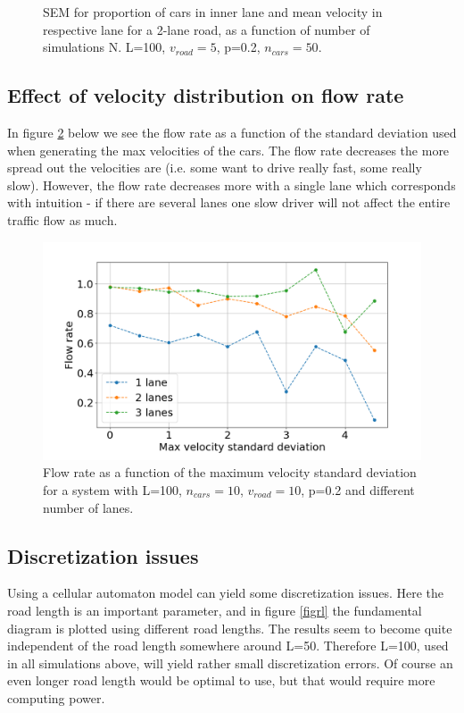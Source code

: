 \documentclass[a4paper,12pt]{article}
\begin{document}
\begin{figure}[H]
\begin{minipage}{.5\textwidth}
    \end{minipage}
    \caption{SEM for proportion of cars in inner lane and mean velocity in respective lane for a 2-lane road, as a function of number of simulations N. L=100, $v_{road}=5$, p=0.2, $n_{cars}=50$.}
    \label{sempv}
\end{figure}


\subsection{Effect of velocity distribution on flow rate}

In figure \ref{fig10} below we see the flow rate as a function of the standard deviation used when generating the max velocities of the cars. The flow rate decreases the more spread out the velocities are (i.e. some want to drive really fast, some really slow). However, the flow rate decreases more with a single lane which corresponds with intuition - if there are several lanes one slow driver will not affect the entire traffic flow as much. 
\begin{figure}[H]
	\centering
        \includegraphics[scale=0.45]{fig10.png}
    \caption{Flow rate as a function of the maximum velocity standard deviation for a system with L=100, $n_{cars}=10$, $v_{road}=10$, p=0.2 and different number of lanes.}
    \label{fig10}
\end{figure}

\subsection{Discretization issues}
Using a cellular automaton model can yield some discretization issues. Here the road length is an important parameter, and in figure \ref{figrl} the fundamental diagram is plotted using different road lengths. The results seem to become quite independent of the road length somewhere around L=50. Therefore L=100, used in all simulations above, will yield rather small discretization errors. Of course an even longer road length would be optimal to use, but that would require more computing power.
\end{document}
